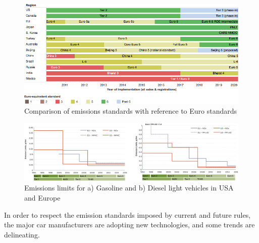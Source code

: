 \begin{figure}[ht]
  \centering
  \includegraphics[width=\textwidth]{figures/review/emission_standards.png}
  \caption{Comparison of emissions standards with reference to Euro standards\label{fig:emission_standards} }
\end{figure}

\begin{figure}[ht]
  \centering
  \includegraphics[width=\textwidth]{figures/review/emissions_levels.png}
  \caption{Emissions limits for a) Gasoline and b) Diesel light vehicles in USA and Europe\label{fig:emission_levels} }
\end{figure}

In order to respect the emission standards imposed by current and future rules, the major car manufacturers are adopting new technologies, and some trends are delineating. 

